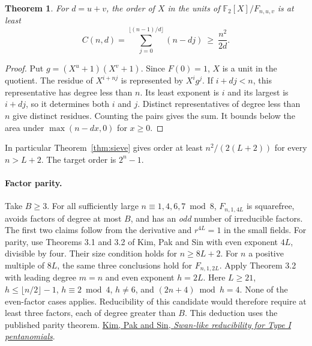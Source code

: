 \documentclass[11pt]{article}
\newtheorem{theorem}{Theorem}
\newcommand{\F}{\mathbb F_2}
\begin{document}
\begin{theorem}\label{thm:order}
For \(d=u+v\), the order of \(X\) in the units of \(\F[X]/F_{n,u,v}\) is at least
\[
 C(n,d)=\sum_{j=0}^{\lfloor(n-1)/d\rfloor}(n-dj)\ \ge\ \frac{n^2}{2d}.
\]
\end{theorem}
\begin{proof}
Put \(g=(X^u+1)(X^v+1)\). Since \(F(0)=1\), \(X\) is a unit in the quotient.
The residue of \(X^{i+nj}\) is represented by \(X^ig^j\).
If \(i+dj<n\), this representative has degree less than \(n\).
Its least exponent is \(i\) and its largest is \(i+dj\), so it determines
both \(i\) and \(j\). Distinct representatives of degree less than \(n\)
give distinct residues. Counting the pairs gives the sum. It bounds below the
area under \(\max(n-dx,0)\) for \(x\ge0\).
\end{proof}
In particular Theorem~\ref{thm:sieve} gives order at least
\(n^2/(2(L+2))\) for every \(n>L+2\). The target order is \(2^n-1\).

\paragraph{Factor parity.}
Take \(B\ge3\). For all sufficiently large \(n\equiv1,4,6,7\bmod8\),
\(F_{n,1,4L}\) is squarefree, avoids factors of degree at most \(B\),
and has an \emph{odd} number of irreducible factors. The first two claims
follow from the derivative and \(r^{4L}=1\) in the small fields. For parity,
use Theorems 3.1 and 3.2 of Kim, Pak and Sin with even exponent \(4L\),
divisible by four. Their size condition holds for \(n\ge8L+2\).
For \(n\) a positive multiple of \(8L\), the same three conclusions hold
for \(F_{n,1,2L}\). Apply Theorem 3.2 with leading degree \(m=n\)
and even exponent \(h=2L\). Here \(L\ge21\),
\(h\le\lfloor n/2\rfloor-1\), \(h\equiv2\bmod4\), \(h\ne6\), and
\((2n+4)\bmod h=4\). None of the even-factor cases applies.
Reducibility of this candidate would therefore require at least three factors,
each of degree greater than \(B\). This deduction uses the published parity
theorem. \href{https://arxiv.org/abs/1406.7597}{Kim, Pak and Sin, \emph{Swan-like reducibility for Type I pentanomials}}.
\end{document}
